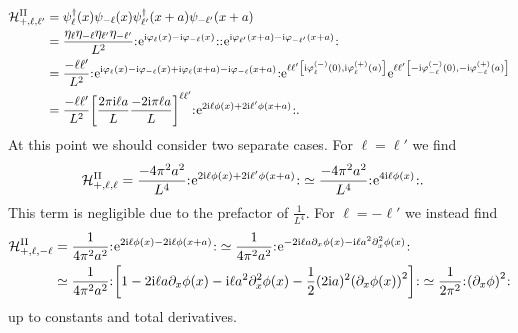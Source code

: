 \documentclass[english, parskip=full]{scrartcl}
\begin{document}
\begin{align}
\mathcal{H}_{+,\ell,\ell'}^\Text{II} &= \psi_{\ell}^\dagger(x) \psi_{-\ell}(x) \psi_{\ell'}^\dagger(x+a) \psi_{-\ell'}(x+a)\\
&= \frac{\eta_\ell\eta_{-\ell} \eta_{\ell'}\eta_{-\ell'}}{L^2} \normord{\powe{\i\varphi_\ell(x) - \i\varphi_{-\ell}(x)}} \normord{\powe{\i\varphi_{\ell'}(x+a) - \i\varphi_{-\ell'}(x+a)}}\\
&= \frac{-\ell\ell'}{L^2} \normord{\powe{\i\varphi_\ell(x) - \i\varphi_{-\ell}(x) + \i\varphi_\ell(x+a) - \i\varphi_{-\ell}(x+a)}} \powe{\ell\ell' \klb*{\i \varphi_{\ell}^{(-)}(0), \i \varphi_{\ell}^{(+)}(a)}} \powe{\ell\ell' \klb*{-\i \varphi_{-\ell}^{(-)}(0), -\i \varphi_{-\ell}^{(+)}(a)}}\\
&= \frac{-\ell\ell'}{L^2} \klb*{\frac{2\pi\i\ell a}{L} \frac{-2\i\pi\ell a}{L}}^{\ell\ell'} \normord{\powe{2\i\ell\phi(x) + 2\i\ell'\phi(x+a)}}.
\end{align}
At this point we should consider two separate cases.
For $\ell=\ell'$ we find
\begin{align}
\mathcal{H}_{+,\ell,\ell}^{\text{II}} &= \frac{-4\pi^2a^2}{L^4} {:\mathrel{\mspace{1mu}\text{e}^{2\text{i}\ell\phi(x) + 2\text{i}\ell'\phi(x+a)}\mspace{1mu}}:} \simeq \frac{-4\pi^2a^2}{L^4} {:\mathrel{\mspace{1mu}\text{e}^{4\text{i}\ell\phi(x)}\mspace{1mu}}:}.
\end{align}
This term is negligible due to the prefactor of $\frac{1}{L^4}$.
For $\ell=-\ell'$ we instead find
\begin{align}
\mathcal{H}_{+,\ell,-\ell}^\Text{II} &= \frac{1}{4\pi^2a^2} \normord{\powe{2\i\ell\phi(x) - 2\i\ell\phi(x+a)}} \simeq \frac{1}{4\pi^2a^2} \normord{\powe{-2\i\ell a\partial_x\phi(x) - \i\ell a^2\partial_x^2\phi(x)}}\\
&\simeq \frac{1}{4\pi^2a^2} \normord{\klb*{1 - 2\i\ell a\partial_x\phi(x) - \i\ell a^2\partial_x^2\phi(x) - \frac{1}{2} (2\i a)^2\kla*{\partial_x\phi(x)}^2 }} \simeq \frac{1}{2\pi^2} \normord{\kla*{\partial_x\phi}^2}
\end{align}
up to constants and total derivatives.
\end{document}
